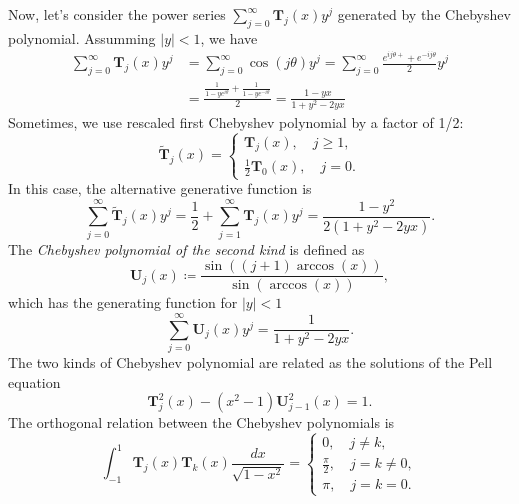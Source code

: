  Now, let's consider the power series $\sum_{j=0}^{\infty}\textbf{T}_j(x)y^j$ generated by the Chebyshev polynomial. Assumming $|y|<1$, we have 
 \begin{equation}
    \begin{split}
        \sum_{j=0}^{\infty}\textbf{T}_j(x)y^j &=\sum_{j=0}^{\infty}\cos(j\theta)y^j=\sum_{j=0}^{\infty}\frac{e^{ij\theta+}+e^{-ij\theta}}{2}y^j\\
        &=\frac{\frac{1}{1-ye^{i\theta}}+\frac{1}{1-ye^{-i\theta}}}{2}=\frac{1-yx}{1+y^2-2yx}
    \end{split}
 \end{equation}
 Sometimes, we use rescaled first Chebyshev polynomial by a factor of 1/2:
 \begin{equation}
    \tilde{\textbf{T}}_j(x)=
    \begin{cases}
        \textbf{T}_j(x), \quad j\ge 1, \\
        \frac{1}{2}\textbf{T}_0(x), \quad j=0.
    \end{cases}
 \end{equation}
In this case, the alternative generative function is
\begin{equation}
    \sum_{j=0}^{\infty}\tilde{\textbf{T}}_j(x)y^j=\frac{1}{2}+\sum_{j=1}^{\infty}\textbf{T}_j(x)y^j=\frac{1-y^2}{2(1+y^2-2yx)}.
\end{equation}
The \textit{Chebyshev polynomial of the second kind} is defined as
\begin{equation}
    \textbf{U}_j(x)\coloneqq\frac{\sin((j+1)\arccos(x))}{\sin(\arccos(x))},
\end{equation}
which has the generating function for $|y|<1$
\begin{equation}
    \sum_{j=0}^{\infty}\textbf{U}_j(x)y^j=\frac{1}{1+y^2-2yx}.
\end{equation}
The two kinds of Chebyshev polynomial are related as the solutions of the Pell equation
\begin{equation}
    \textbf{T}^2_j(x)-(x^2-1)\textbf{U}_{j-1}^2(x)=1.
\end{equation}
The orthogonal relation between the Chebyshev polynomials is
\begin{equation}
    \int_{-1}^{1}\textbf{T}_j(x)\textbf{T}_k(x)\frac{dx}{\sqrt{1-x^2}}=
    \begin{cases}
        0, \quad j\neq k,\\
        \frac{\pi}{2}, \quad j=k\neq0, \\
        \pi, \quad j=k=0.
    \end{cases}
\end{equation}
